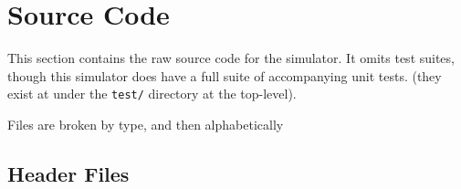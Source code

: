 \documentclass{article}
\begin{document}

\clearpage


\clearpage

\section{Source Code}

This section contains the raw source code for the simulator. It omits test
suites, though this simulator does have a full suite of accompanying unit tests.
(they exist at under the \texttt{test/} directory at the top-level).

Files are broken by type, and then alphabetically

\subsection{Header Files}


\clearpage

\clearpage

\clearpage

\clearpage

\clearpage

\clearpage

\clearpage

\clearpage

\clearpage

\clearpage

\clearpage
\end{document}
